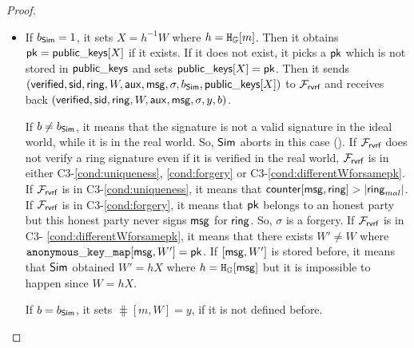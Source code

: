\begin{proof}
\begin{itemize}
		\begin{itemize}
			\item 		If $ b_{\mathsf{Sim}} = 1 $, it sets $ X = h^{-1} W$ where $ h = \mathtt{H_{\mathbb{G}}}[m] $. Then it obtains $ \mathsf{pk}  = {\mathsf{public\_keys}}[X]$ if it exists. If it does not exist, it picks a $ \mathsf{pk}  $ which is not stored in $ {\mathsf{public\_keys}} $ and sets $ {\mathsf{public\_keys}}[X] = \mathsf{pk} $. Then it sends  $ (\mathsf{verified}, \textsf{sid}, \mathsf{ring}, W,\mathsf{aux},\mathsf{msg}, \sigma, b_{\mathsf{Sim}}, {\mathsf{public\_keys}}[X]) $ to $ \mathcal{F}_{\textsf{rvrf}} $ and receives back $ (\mathsf{verified}, \textsf{sid}, \mathsf{ring}, W, \mathsf{aux}, \mathsf{msg}, \sigma, y, b) $. 
			
			 If $ b \neq b_{\mathsf{Sim}} $, it means that the signature is not a valid signature in the ideal world, while it is in the real world. So, $ \mathsf{Sim} $ aborts in this case ().
				If $ \mathcal{F}_{\textsf{rvrf}} $ does not verify a ring signature even if  it is verified in the real world, $ \mathcal{F}_{\textsf{rvrf}} $ is in either C3-\ref{cond:uniqueness}, \ref{cond:forgery} or C3-\ref{cond:differentWforsamepk}.
				If $ \mathcal{F}_{\textsf{rvrf}} $ is in C3-\ref{cond:uniqueness}, it means that $ \mathsf{counter}[\mathsf{msg},\mathsf{ring}] > |\mathsf{ring}_{mal}| $. If $ \mathcal{F}_{\textsf{rvrf}} $ is in C3-\ref{cond:forgery}, it means that $ \mathsf{pk}$ belongs to an honest party but this honest party never signs $ \mathsf{msg} $ for  $ \mathsf{ring} $. So, $ \sigma $ is a forgery.	 If $ \mathcal{F}_{\textsf{rvrf}} $ is in C3- \ref{cond:differentWforsamepk}, it means that there exists $ W' \neq W $ where $ \mathtt{anonymous\_key\_map}[\mathsf{msg},W'] = \mathsf{pk}$. If $ [\mathsf{msg},W'] $ is stored before, it means that $ \mathsf{Sim} $ obtained $ W' = hX $ where $ h =\mathtt{H_{\mathbb{G}}}[\mathsf{msg}] $ but it is impossible to happen since $ W = hX $.
			
				 If $ b = b_{\mathsf{Sim}} $, it sets $\mathtt{\hash}[m,W] = y $, if it is not defined before.
				


\end{itemize}
\end{itemize}
\end{proof}
